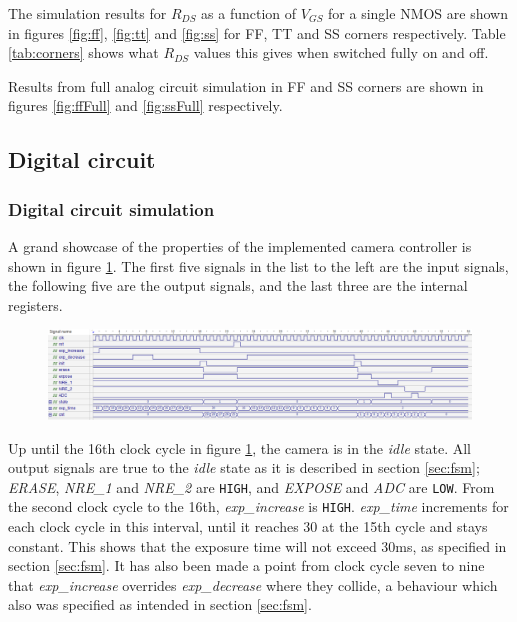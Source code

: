 The simulation results for $R_{DS}$ as a function of $V_{GS}$ for a single NMOS are shown in figures \ref{fig:ff}, \ref{fig:tt} and \ref{fig:ss} for FF, TT and SS corners respectively. Table \ref{tab:corners} shows what $R_{DS}$ values this gives when switched fully on and off.

Results from full analog circuit simulation in FF and SS corners are shown in figures \ref{fig:ffFull} and \ref{fig:ssFull} respectively.

\subsection{Digital circuit}


\subsubsection{Digital circuit simulation}

A grand showcase of the properties of the implemented camera controller is shown in figure \ref{fig:waveform}. The first five signals in the list to the left are the input signals, the following five are the output signals, and the last three are the internal registers.

\begin{figure}[H]
    \centering
    \includegraphics[width=\textwidth]{graphs/digital_waveform.png}
    \label{fig:waveform}
\end{figure}

Up until the 16th clock cycle in figure \ref{fig:waveform}, the camera is in the \emph{idle} state. All output signals are true to the \emph{idle} state as it is described in section \ref{sec:fsm}; \emph{ERASE}, \emph{NRE\_1} and \emph{NRE\_2} are \verb|HIGH|, and \emph{EXPOSE} and \emph{ADC} are \verb|LOW|. From the second clock cycle to the 16th, \emph{exp\_increase} is \verb|HIGH|. \emph{exp\_time} increments for each clock cycle in this interval, until it reaches $30$ at the 15th cycle and stays constant. This shows that the exposure time will not exceed $30$ms, as specified in section \ref{sec:fsm}. It has also been made a point from clock cycle seven to nine that \emph{exp\_increase} overrides \emph{exp\_decrease} where they collide, a behaviour which also was specified as intended in section \ref{sec:fsm}.

